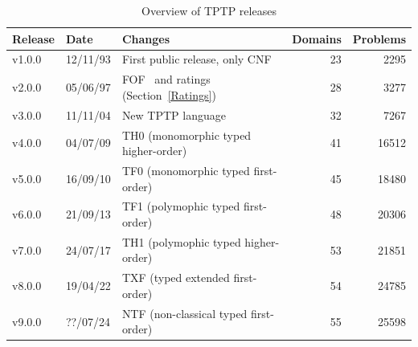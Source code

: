 \documentclass{easychair}
\begin{document}
\begin{table}[htb]
\begin{center}
\setlength{\tabcolsep}{4pt}
\begin{tabular}{ll|l|rr}
Release & Date     & Changes                                              & Domains & Problems \\
\hline
v1.0.0  & 12/11/93 & First public release, only CNF~\cite{SS98-JAR}       &      23 &     2295 \\
v2.0.0  & 05/06/97 & FOF~\cite{Sut09} and ratings (Section~\ref{Ratings}) &      28 &     3277 \\
v3.0.0  & 11/11/04 & New TPTP language~\cite{SS+06}                       &      32 &     7267 \\
v4.0.0  & 04/07/09 & TH0 (monomorphic typed higher-order)~\cite{SB10}     &      41 &    16512 \\
v5.0.0  & 16/09/10 & TF0 (monomorphic typed first-order)~\cite{SS+12}     &      45 &    18480 \\
v6.0.0  & 21/09/13 & TF1 (polymophic typed first-order)~\cite{BP13-TFF1}  &      48 &    20306 \\
v7.0.0  & 24/07/17 & TH1 (polymophic typed higher-order)~\cite{KSR16}     &      53 &    21851 \\
v8.0.0  & 19/04/22 & TXF (typed extended first-order)~\cite{SK18}         &      54 &    24785 \\
v9.0.0  & ??/07/24 & NTF (non-classical typed first-order)~\cite{SF+22}   &      55 &    25598 \\
\end{tabular}
\end{center}
\caption{Overview of TPTP releases}
\label{tab:Releases}
\end{table}
\end{document}
